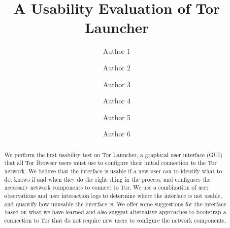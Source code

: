 \documentclass[USenglish,oneside,twocolumn]{article}
\begin{document}
   \author*[1]{Author 1}

  \author[2]{Author 2}

  \author[3]{Author 3}

  \author[4]{Author 4}

  \author[5]{Author 5}
  
  \author[6]{Author 6}

%
%
%
%
%  
%
%
%
%
%  
%   

  \title{\huge A Usability Evaluation of Tor Launcher}



  \begin{abstract}
{
We perform the first usability test on Tor Launcher, a graphical user interface (GUI) 
that all Tor Browser users must use to configure their initial connection to the Tor network. 
We believe that the interface is usable if a new user can to identify what to do,
knows if and when they do the right thing in the process, 
and configures the necessary network components to connect to Tor. 
We use a combination of user observations and user interaction logs to determine
where the interface is not usable, and quantify how unusable the interface is. We 
offer some suggestions for the interface based on what 
we have learned and also suggest alternative approaches 
to bootstrap a connection to Tor that do not require new users to configure the network components. 
}
\end{abstract}
\end{document}
